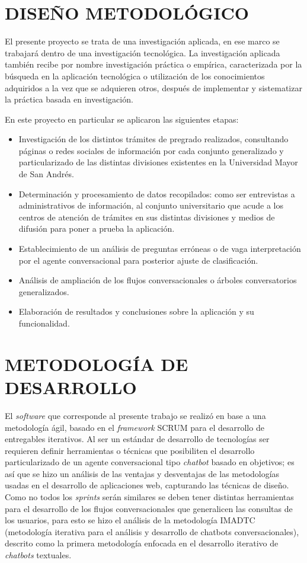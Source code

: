 \documentclass[letter, openright, 12pt]{book}
\begin{document}
\section{DISEÑO METODOLÓGICO}
El presente proyecto se trata de una investigación aplicada, en ese marco se trabajará dentro de una investigación tecnológica. La investigación aplicada también recibe por nombre investigación práctica o empírica, caracterizada por la búsqueda en la aplicación tecnológica o utilización de los conocimientos adquiridos a la vez que se adquieren otros, después de implementar y sistematizar la práctica basada en investigación. 
\par
En este proyecto en particular se aplicaron las siguientes etapas: 
\begin{itemize}
\item Investigación de los distintos trámites de pregrado realizados, consultando páginas o redes sociales de información por cada conjunto generalizado y particularizado de las distintas divisiones existentes en la Universidad Mayor de San Andrés. 
\item Determinación y procesamiento de datos recopilados: como ser entrevistas a administrativos de información, al conjunto universitario que acude a los centros de atención de trámites en sus distintas divisiones y medios de difusión para poner a prueba la aplicación.
\item Establecimiento de un análisis de preguntas erróneas o de vaga interpretación por el agente conversacional para posterior ajuste de clasificación. 
\item Análisis de ampliación de los flujos conversacionales o árboles conversatorios generalizados.  
\item Elaboración de resultados y conclusiones sobre la aplicación y su funcionalidad. 
\end{itemize}

\section{METODOLOGÍA DE DESARROLLO}
El \textit{software} que corresponde al presente trabajo se realizó en base a una metodología ágil, basado en el \textit{framework} SCRUM para el desarrollo de entregables iterativos. Al ser un estándar de desarrollo de tecnologías ser requieren definir herramientas o técnicas que posibiliten el desarrollo particularizado de un agente conversacional tipo \textit{chatbot} basado en objetivos; es así que se hizo un análisis de las ventajas y desventajas de las metodologías usadas en el desarrollo de aplicaciones web, capturando las técnicas de diseño. Como no todos los \textit{sprints} serán similares se deben tener distintas herramientas para el desarrollo de los flujos conversacionales que generalicen las consultas de los usuarios, para esto se hizo el análisis de la metodología IMADTC (metodología iterativa para el análisis y desarrollo de chatbots conversacionales), descrito como la primera metodología enfocada en el desarrollo iterativo de \textit{chatbots} textuales. 
\end{document}
